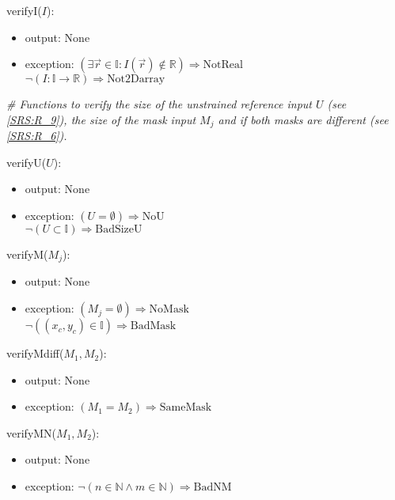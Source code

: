\documentclass[12pt, titlepage]{article}
\begin{document}
\noindent verifyI($I$):
\begin{itemize}
\item output: None
\item exception:\newline
$(\exists \vec{r} \in \mathbb{I}: I(\vec{r}) \notin \mathbb{R}) \Rightarrow 
\text{NotReal}$\\
$\neg(I:\mathbb{I} \rightarrow \mathbb{R})\Rightarrow \text{Not2Darray}$
\end{itemize}
\bigskip

\noindent\textit{{\#} Functions to verify the size of the unstrained reference 
input $U$ (see \cref{SRS:R_9}), the size of the mask input $M_j$ and if both 
masks are different (see \cref{SRS:R_6}).}
\medskip

\noindent verifyU($U$):
\begin{itemize}
\item output: None
\item exception:\newline
$(U=\emptyset)\Rightarrow\text{NoU}$\\
$\neg (U \subset \mathbb{I}) \Rightarrow \text{BadSizeU}$
\end{itemize}
\bigskip

\noindent verifyM($M_j$):
\begin{itemize}
\item output: None
\item exception:\newline
$(M_j=\emptyset)\Rightarrow\text{NoMask}$\\
$\neg((x_c,y_c) \in \mathbb{I})\Rightarrow \text{BadMask}$\\
\end{itemize}
\bigskip

\noindent verifyMdiff($M_1,M_2$):
\begin{itemize}
\item output: None
\item exception:\newline
$(M_1=M_2)\Rightarrow\text{SameMask}$
\end{itemize}
\bigskip

\noindent verifyMN($M_1,M_2$):
\begin{itemize}
\item output: None
\item exception:\newline
$\neg (n \in \mathbb{N} \wedge m \in \mathbb{N}) \Rightarrow \text{BadNM}$
\end{itemize}
\end{document}
